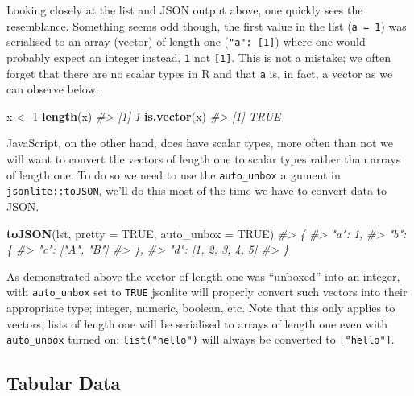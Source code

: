 \documentclass[
  10pt,
]{krantz}
\makeatletter
\newenvironment{Shaded}{\begin{snugshade}}{\end{snugshade}}
\newcommand{\CommentTok}[1]{\textcolor[rgb]{0.37,0.37,0.37}{\textit{#1}}}
\newcommand{\DataTypeTok}[1]{\textcolor[rgb]{0.27,0.27,0.27}{#1}}
\newcommand{\DecValTok}[1]{\textcolor[rgb]{0.06,0.06,0.06}{#1}}
\newcommand{\KeywordTok}[1]{\textcolor[rgb]{0.27,0.27,0.27}{\textbf{#1}}}
\newcommand{\NormalTok}[1]{#1}
\newcommand{\OtherTok}[1]{\textcolor[rgb]{0.37,0.37,0.37}{#1}}
\newcommand{\StringTok}[1]{\textcolor[rgb]{0.5,0.5,0.5}{#1}}
\newenvironment{kframe}{%
\medskip{}
\setlength{\fboxsep}{.8em}
 \def\at@end@of@kframe{}%
 \ifinner\ifhmode%
  \def\at@end@of@kframe{\end{minipage}}%
  \begin{minipage}{\columnwidth}%
 \fi\fi%
 \def\FrameCommand##1{\hskip\@totalleftmargin \hskip-\fboxsep
 \colorbox{shadecolor}{##1}\hskip-\fboxsep
     \hskip-\linewidth \hskip-\@totalleftmargin \hskip\columnwidth}%
 \MakeFramed {\advance\hsize-\width
   \@totalleftmargin\z@ \linewidth\hsize
   \@setminipage}}%
 {\par\unskip\endMakeFramed%
 \at@end@of@kframe}
\renewenvironment{Shaded}{\begin{kframe}}{\end{kframe}}
\makeatother
\begin{document}
Looking closely at the list and JSON output above, one quickly sees the resemblance. Something seems odd though, the first value in the list (\texttt{a\ =\ 1}) was serialised to an array (vector) of length one (\texttt{"a":\ {[}1{]}}) where one would probably expect an integer instead, \texttt{1} not \texttt{{[}1{]}}. This is not a mistake; we often forget that there are no scalar types in R and that \texttt{a} is, in fact, a vector as we can observe below.

\begin{Shaded}
\begin{Highlighting}[]
\NormalTok{x <{-}}\StringTok{ }\DecValTok{1}
\KeywordTok{length}\NormalTok{(x)}
\CommentTok{\#> [1] 1}
\KeywordTok{is.vector}\NormalTok{(x)}
\CommentTok{\#> [1] TRUE}
\end{Highlighting}
\end{Shaded}

JavaScript, on the other hand, does have scalar types, more often than not we will want to convert the vectors of length one to scalar types rather than arrays of length one. To do so we need to use the \texttt{auto\_unbox} argument in \texttt{jsonlite::toJSON}, we'll do this most of the time we have to convert data to JSON.

\begin{Shaded}
\begin{Highlighting}[]
\KeywordTok{toJSON}\NormalTok{(lst, }\DataTypeTok{pretty =} \OtherTok{TRUE}\NormalTok{, }\DataTypeTok{auto\_unbox =} \OtherTok{TRUE}\NormalTok{)}
\CommentTok{\#> \{}
\CommentTok{\#>   "a": 1,}
\CommentTok{\#>   "b": \{}
\CommentTok{\#>     "c": ["A", "B"]}
\CommentTok{\#>   \},}
\CommentTok{\#>   "d": [1, 2, 3, 4, 5]}
\CommentTok{\#> \}}
\end{Highlighting}
\end{Shaded}

As demonstrated above the vector of length one was ``unboxed'' into an integer, with \texttt{auto\_unbox} set to \texttt{TRUE} jsonlite will properly convert such vectors into their appropriate type; integer, numeric, boolean, etc. Note that this only applies to vectors, lists of length one will be serialised to arrays of length one even with \texttt{auto\_unbox} turned on: \texttt{list("hello")} will always be converted to \texttt{{[}"hello"{]}}.

\hypertarget{basics-tabular}{%
\subsection{Tabular Data}\label{basics-tabular}}
\end{document}
